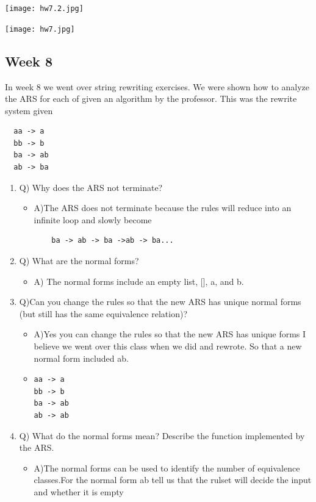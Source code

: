\documentclass{article}
\theoremstyle{theorem}
\theoremstyle{definition}
\theoremstyle{remark}
\begin{document}
\begin{center}
\texttt{[image: hw7.2.jpg]}
\end{center}
\begin{center}
\item \texttt{[image: hw7.jpg]}
\end{center}
\subsection{Week 8}
 In week 8 we went over string rewriting exercises. We were shown how to analyze the ARS for each of given an algorithm by the professor.   This was the rewrite system given
\begin{verbatim}
  aa -> a
  bb -> b
  ba -> ab
  ab -> ba
  \end{verbatim}
 \begin{enumerate}
\item Q) Why does the ARS not terminate?
\begin{itemize}
\item  A)The ARS does not terminate because the rules will reduce into an infinite loop and slowly become 
\begin{verbatim}
    ba -> ab -> ba ->ab -> ba...
\end{verbatim}

\end{itemize}
\item Q) What are the normal forms? 
\begin{itemize}
\item A) The normal forms include an empty list, [], a, and b. 
\end{itemize}
\item Q)Can you change the rules so that the new ARS has unique normal forms (but still has the same equivalence relation)? 
\begin{itemize}
\item A)Yes you can change the rules so that the new ARS has unique forms I believe we went over this class when we did and rewrote. So that a new normal form included ab.
\item \begin{verbatim}
aa -> a
bb -> b
ba -> ab
ab -> ab
\end{verbatim}
\end{itemize}

\item Q) What do the normal forms mean? Describe the function implemented by the ARS. 
\begin{itemize}
\item A)The normal forms can be used to identify the number of equivalence classes.For the normal form ab tell us that the rulset will decide the input and whether it is empty
\end{itemize}

   \end{enumerate}
\end{document}
